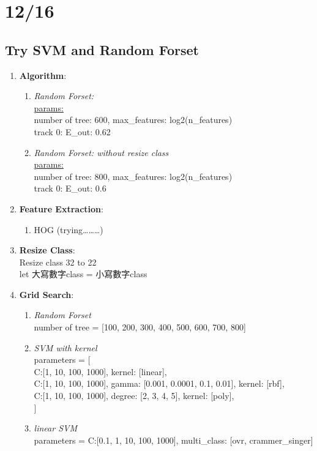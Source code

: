 \documentclass[12pt]{article}
\theoremstyle{definition}
\theoremstyle{remark}
\begin{document}
\newpage
\section{12/16}
\subsection{Try SVM and Random Forset}
\begin{enumerate}
  \item \textbf{Algorithm}:
      \begin{enumerate}
          \item {\em Random Forset:\/} \\
            \underline{params:} \\
            number of tree: 600, max\_features: log2(n\_features)\\
            {\color{red}track 0: E\_out: 0.62}
          \item {\em Random Forset: without resize class \/} \\
            \underline{params:} \\
            number of tree: 800, max\_features: log2(n\_features)\\
            {\color{red}track 0: E\_out: 0.6}
      \end{enumerate}
    \item \textbf{Feature Extraction}:
      \begin{enumerate}
        \item HOG (trying\dots\dots\dots)
      \end{enumerate}
    \item \textbf{Resize Class}:\\
      Resize class 32 to 22\\
      let 大寫數字class =  小寫數字class
    \item \textbf{Grid Search}:
      \begin{enumerate}
        \item {\em Random Forset\/} \\
          number of tree = [100, 200, 300, 400, 500, 600, 700, 800]
        \item {\em SVM with kernel\/}\\
        parameters = [ \\
          {C:[1, 10, 100, 1000], kernel: [linear]},\\
          {C:[1, 10, 100, 1000], gamma: [0.001, 0.0001, 0.1, 0.01], kernel: [rbf]},\\
          {C:[1, 10, 100, 1000], degree: [2, 3, 4, 5], kernel: [poly]}, \\
        ]
        \item {\em linear SVM\/}\\
        parameters = {C:[0.1, 1, 10, 100, 1000], multi\_class: [ovr, crammer\_singer]}
      \end{enumerate}
\end{enumerate}
\newpage
\end{document}
